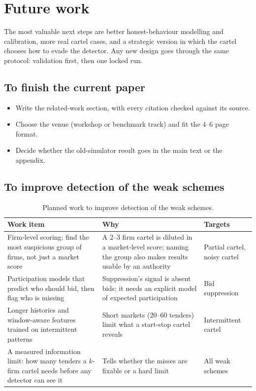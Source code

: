\documentclass[11pt,a4paper]{article}
\begin{document}
\section{Future work}

The most valuable next steps are better honest-behaviour modelling and calibration, more real cartel cases, and a strategic version in which the cartel chooses how to evade the detector. Any new design goes through the same protocol: validation first, then one locked run.

\subsection{To finish the current paper}
\begin{itemize}[label=$\square$]
\item Write the related-work section, with every citation checked against its source.
\item Choose the venue (workshop or benchmark track) and fit the 4--6 page format.
\item Decide whether the old-simulator result goes in the main text or the appendix.
\end{itemize}

\subsection{To improve detection of the weak schemes}

\begin{table}[H]
\centering
\small
\begin{tabular}{@{}p{6.2cm}p{6cm}p{2.8cm}@{}}
\toprule
Work item & Why & Targets \\
\midrule
Firm-level scoring: find the most suspicious group of firms, not just a market score & A 2--3 firm cartel is diluted in a market-level score; naming the group also makes results usable by an authority & Partial cartel, noisy cartel \\
Participation models that predict who should bid, then flag who is missing & Suppression's signal is absent bids; it needs an explicit model of expected participation & Bid suppression \\
Longer histories and window-aware features trained on intermittent patterns & Short markets (20--60 tenders) limit what a start-stop cartel reveals & Intermittent cartel \\
A measured information limit: how many tenders a $k$-firm cartel needs before any detector can see it & Tells whether the misses are fixable or a hard limit & All weak schemes \\
\bottomrule
\end{tabular}
\caption{Planned work to improve detection of the weak schemes.}
\end{table}
\end{document}

